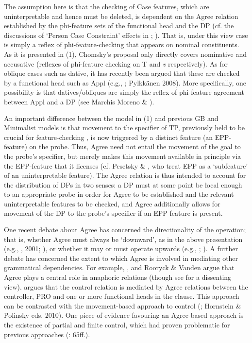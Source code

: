 \documentclass[output=paper]{langsci/langscibook}
\begin{document}
The assumption here is that the checking of Case features, which are uninterpretable and hence must be deleted, is dependent on the Agree relation established by the phi-feature sets of the functional head and the DP (cf. the discussions of ‘Person Case Constraint’ effects in \citealt{Anagnostopoulou2003}; \citealt{Rezac2008}). That is, under this view case is simply a reflex of phi-feature-checking that appears on nominal constituents. As it is presented in (1), Chomsky’s proposal only directly covers nominative and accusative (reflexes of phi-feature checking on T and \textit{v} respectively). As for oblique cases such as dative, it has recently been argued that these are checked by a functional head such as Appl (e.g., \citealt{Cuervo2003}; Pylkkänen 2008). More specifically, one possibility is that datives/obliques are simply the reflex of phi-feature agreement between Appl and a DP (see Marchis Moreno \& \citealt{Franco2017}).

An important difference between the model in (1) and previous GB and Minimalist models is that movement to the specifier of TP, previously held to be crucial for feature-checking \citep{Chomsky1995}, is now triggered by a distinct feature (an EPP-feature) on the probe. Thus, Agree need not entail the movement of the goal to the probe’s specifier, but merely makes this movement available in principle via the EPP-feature that it licenses (cf. Pesetsky \& \citealt{Torrego2001}, who treat EPP as a ‘subfeature’ of an uninterpretable feature). The Agree relation is thus intended to account for the distribution of DPs in two senses: a DP must at some point be local enough to an appropriate probe in order for Agree to be established and the relevant uninterpretable features to be checked, and Agree additionally allows for movement of the DP to the probe’s specifier if an EPP-feature is present.

One recent debate about Agree has concerned the directionality of the operation; that is, whether Agree must always be ‘downward’, as in the above presentation (e.g., \citealt{Chomsky2000}, 2001; \citealt{Preminger2013}), or whether it may or must operate upwards (e.g., \citealt{Zeijlstra2012}; \citealt{Ackema2018}). A further debate has concerned the extent to which Agree is involved in mediating other grammatical dependencies. For example, \citet{Reuland2001}, \citet{Hicks2009} and Rooryck \& Vanden \citet{Wyngaerd2011} argue that Agree plays a central role in anaphoric relations (though see \citealt{Safir2014} for a dissenting view). \citet{Landau2000} argues that the control relation is mediated by Agree relations between the controller, PRO and one or more functional heads in the clause. This approach can be contrasted with the movement-based approach to control (\citealt{Hornstein1999}; Hornstein \& Polinsky eds. 2010). One piece of evidence favouring an Agree-based approach is the existence of partial and finite control, which had proven problematic for previous approaches (\citealt{Landau2013}: 65ff.).
\end{document}
